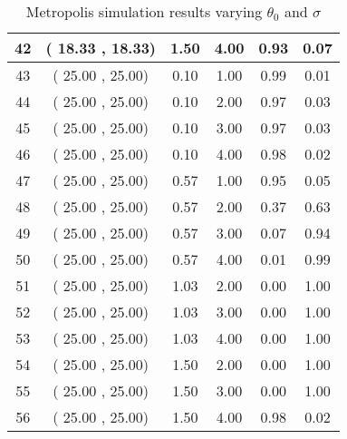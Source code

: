 \begin{center}
\begin{table}
\begin{tabular}{|cccccc|}
42 & (   18.33 ,    18.33) &     1.50 &     4.00 &     0.93 &     0.07 \\  \hline
43 & (   25.00 ,    25.00) &     0.10 &     1.00 &     0.99 &     0.01 \\  \hline
44 & (   25.00 ,    25.00) &     0.10 &     2.00 &     0.97 &     0.03 \\  \hline
45 & (   25.00 ,    25.00) &     0.10 &     3.00 &     0.97 &     0.03 \\  \hline
46 & (   25.00 ,    25.00) &     0.10 &     4.00 &     0.98 &     0.02 \\  \hline
47 & (   25.00 ,    25.00) &     0.57 &     1.00 &     0.95 &     0.05 \\  \hline
48 & (   25.00 ,    25.00) &     0.57 &     2.00 &     0.37 &     0.63 \\  \hline
49 & (   25.00 ,    25.00) &     0.57 &     3.00 &     0.07 &     0.94 \\  \hline
50 & (   25.00 ,    25.00) &     0.57 &     4.00 &     0.01 &     0.99 \\  \hline
51 & (   25.00 ,    25.00) &     1.03 &     2.00 &     0.00 &     1.00 \\  \hline
52 & (   25.00 ,    25.00) &     1.03 &     3.00 &     0.00 &     1.00 \\  \hline
53 & (   25.00 ,    25.00) &     1.03 &     4.00 &     0.00 &     1.00 \\  \hline
54 & (   25.00 ,    25.00) &     1.50 &     2.00 &     0.00 &     1.00 \\  \hline
55 & (   25.00 ,    25.00) &     1.50 &     3.00 &     0.00 &     1.00 \\  \hline
56 & (   25.00 ,    25.00) &     1.50 &     4.00 &     0.98 &     0.02 \\  \hline
\end{tabular}
\caption{ Metropolis simulation results varying $\theta_0$ and $\sigma$ }
\end{table}
\end{center}
